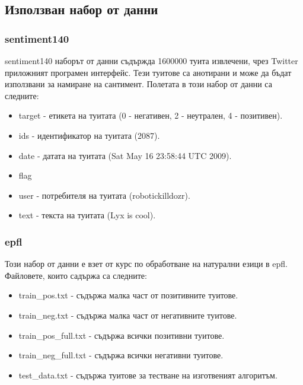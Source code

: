\documentclass{article}
\begin{document}
    \subsection{Използван набор от данни}

    \subsubsection{sentiment140}

    sentiment140 наборът от данни съдържда 1600000 туита извлечени, чрез Twitter приложният програмен интерфейс. Тези
    туитове са анотирани и може да бъдат използвани за намиране на сантимент. Полетата в този набор от данни са следните:

    \begin{itemize}

        \item target - етикета на туитата (0 - негативен, 2 - неутрален, 4 - позитивен).
        \item ids - идентификатор на туитата (2087).
        \item date - датата на туитата (Sat May 16 23:58:44 UTC 2009).
        \item flag
        \item user - потребителя на туитата (robotickilldozr).
        \item text - текста на туитата (Lyx is cool). \cite{sentiment140}

    \end{itemize}

    \subsubsection{epfl}

    Този набор от данни е взет от курс по обработване на натурални езици в epfl. Файловете, които садържа са следните:

    \begin{itemize}

        \item train\_pos.txt - съдържа малка част от позитивните туитове.
        \item train\_neg.txt - съдържа малка част от негативните туитове.
        \item train\_pos\_full.txt - съдържа всички позитивни туитове.
        \item train\_neg\_full.txt - съдържа всички негативни туитове.
        \item test\_data.txt - съдържа туитове за тестване на изготвеният алгоритъм.

    \end{itemize}
\end{document}
